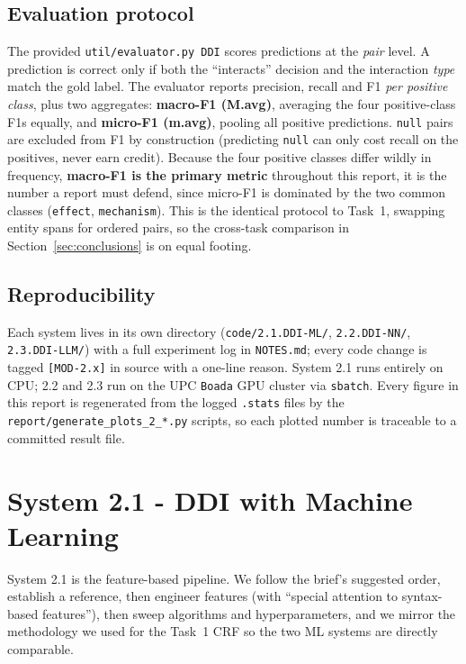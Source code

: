 \documentclass[a4paper,11pt]{article}
\begin{document}
\subsection{Evaluation protocol}
The provided \texttt{util/evaluator.py~DDI} scores predictions at the
\emph{pair} level. A prediction is correct only if both the
``interacts'' decision and the interaction \emph{type} match the gold
label. The evaluator reports precision, recall and F1 \emph{per positive
class}, plus two aggregates: \textbf{macro-F1 (M.avg)}, averaging the
four positive-class F1s equally, and \textbf{micro-F1 (m.avg)}, pooling
all positive predictions. \texttt{null} pairs are excluded from F1 by
construction (predicting \texttt{null} can only cost recall on the
positives, never earn credit). Because the four positive classes differ
wildly in frequency, \textbf{macro-F1 is the primary metric} throughout
this report, it is the number a report must defend, since micro-F1 is
dominated by the two common classes (\texttt{effect}, \texttt{mechanism}).
This is the identical protocol to Task~1, swapping entity spans for
ordered pairs, so the cross-task comparison in
Section~\ref{sec:conclusions} is on equal footing.

\subsection{Reproducibility}
Each system lives in its own directory (\texttt{code/2.1.DDI-ML/},
\texttt{2.2.DDI-NN/}, \texttt{2.3.DDI-LLM/}) with a full experiment log
in \texttt{NOTES.md}; every code change is tagged \texttt{[MOD-2.x]} in
source with a one-line reason. System 2.1 runs entirely on CPU; 2.2 and
2.3 run on the UPC \texttt{Boada} GPU cluster via \texttt{sbatch}. Every
figure in this report is regenerated from the logged \texttt{.stats}
files by the \texttt{report/generate\_plots\_2\_*.py} scripts, so each
plotted number is traceable to a committed result file.

\section{System 2.1 - DDI with Machine Learning}\label{sec:ml}

System 2.1 is the feature-based pipeline. We follow the brief's
suggested order, establish a reference, then engineer features (with
``special attention to syntax-based features''), then sweep algorithms
and hyperparameters, and we mirror the methodology we used for the
Task~1 CRF so the two ML systems are directly comparable.
\end{document}
